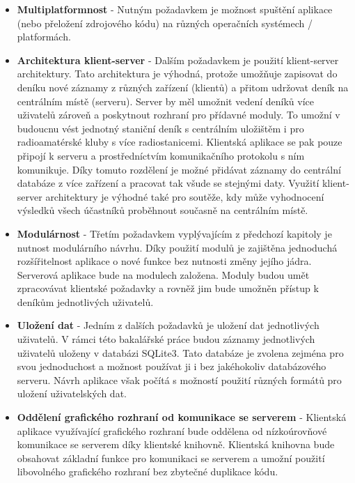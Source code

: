 \begin{itemize}
\item \textbf{Multiplatformnost} - Nutným požadavkem je možnost spuštění
aplikace (nebo přeložení zdrojového kódu) na různých operačních systémech / platformách.
\item \textbf{Architektura klient-server} - Dalším požadavkem je použití klient-server
architektury. Tato architektura je výhodná, protože umožňuje zapisovat do deníku
nové záznamy z různých zařízení (klientů) a přitom udržovat deník na centrálním místě (serveru).
Server by měl umožnit vedení deníků více uživatelů zároveň a poskytnout rozhraní pro přídavné moduly.
To umožní v budoucnu vést jednotný staniční deník s centrálním uložištěm i pro radioamatérské
kluby s více radiostanicemi.
Klientská aplikace se pak pouze připojí k serveru a prostředníctvím komunikačního protokolu s ním komunikuje.
Díky tomuto rozdělení je možné přidávat záznamy do centrální databáze z více zařízení a pracovat
tak všude se stejnými daty. Využití klient-server architektury je výhodné také pro soutěže, kdy může vyhodnocení
výsledků všech účastníků proběhnout současně na centrálním místě.
\item \textbf{Modulárnost} - Třetím požadavkem vyplývajícím z předchozí kapitoly je nutnost modulárního návrhu.
Díky použití modulů je zajištěna jednoduchá rozšířitelnost aplikace o nové funkce bez nutnosti změny jejího jádra.
Serverová aplikace bude na modulech založena. Moduly budou umět zpracovávat klientské požadavky a rovněž jim bude umožněn
přístup k deníkům jednotlivých uživatelů. 
\item \textbf{Uložení dat} - Jedním z dalších požadavků je uložení dat jednotlivých uživatelů.
 V rámci této bakalářské práce budou záznamy
jednotlivých uživatelů uloženy v databázi SQLite3. Tato databáze je zvolena zejména pro svou jednoduchost a 
možnost používat ji i bez jakéhokoliv databázového serveru.
 Návrh aplikace
však počítá s možností použití různých formátů pro uložení uživatelských dat.
\item \textbf{Oddělení grafického rozhraní od komunikace se serverem} - Klientská aplikace využívající grafického rozhraní
bude oddělena od nízkoúrovňové komunikace se serverem díky klientské knihovně. Klientská knihovna bude obsahovat základní funkce
pro komunikaci se serverem a umožní použití libovolného grafického rozhraní bez zbytečné duplikace kódu.
\end{itemize}

